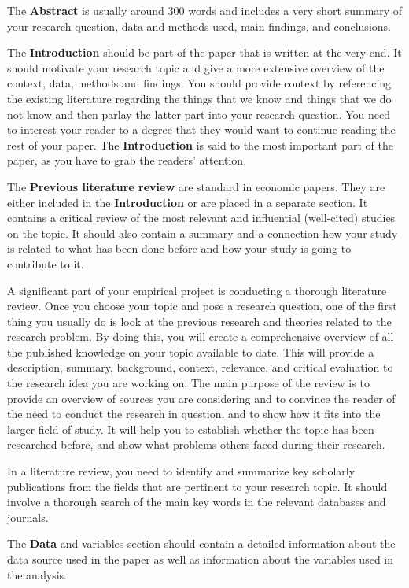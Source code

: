 \documentclass[
]{book}
\begin{document}
The \textbf{Abstract} is usually around 300 words and includes a very
short summary of your research question, data and methods used, main
findings, and conclusions.

The \textbf{Introduction} should be part of the paper that is written at
the very end. It should motivate your research topic and give a more
extensive overview of the context, data, methods and findings. You
should provide context by referencing the existing literature regarding
the things that we know and things that we do not know and then parlay
the latter part into your research question. You need to interest your
reader to a degree that they would want to continue reading the rest of
your paper. The \textbf{Introduction} is said to the most important part
of the paper, as you have to grab the readers' attention.

The \textbf{Previous literature review} are standard in economic papers.
They are either included in the \textbf{Introduction} or are placed in a
separate section. It contains a critical review of the most relevant and
influential (well-cited) studies on the topic. It should also contain a
summary and a connection how your study is related to what has been done
before and how your study is going to contribute to it.

A significant part of your empirical project is conducting a thorough
literature review. Once you choose your topic and pose a research
question, one of the first thing you usually do is look at the previous
research and theories related to the research problem. By doing this,
you will create a comprehensive overview of all the published knowledge
on your topic available to date. This will provide a description,
summary, background, context, relevance, and critical evaluation to the
research idea you are working on. The main purpose of the review is to
provide an overview of sources you are considering and to convince the
reader of the need to conduct the research in question, and to show how
it fits into the larger field of study. It will help you to establish
whether the topic has been researched before, and show what problems
others faced during their research.

In a literature review, you need to identify and summarize key scholarly
publications from the fields that are pertinent to your research topic.
It should involve a thorough search of the main key words in the
relevant databases and journals.

The \textbf{Data} and variables section should contain a detailed
information about the data source used in the paper as well as
information about the variables used in the analysis.
\end{document}
